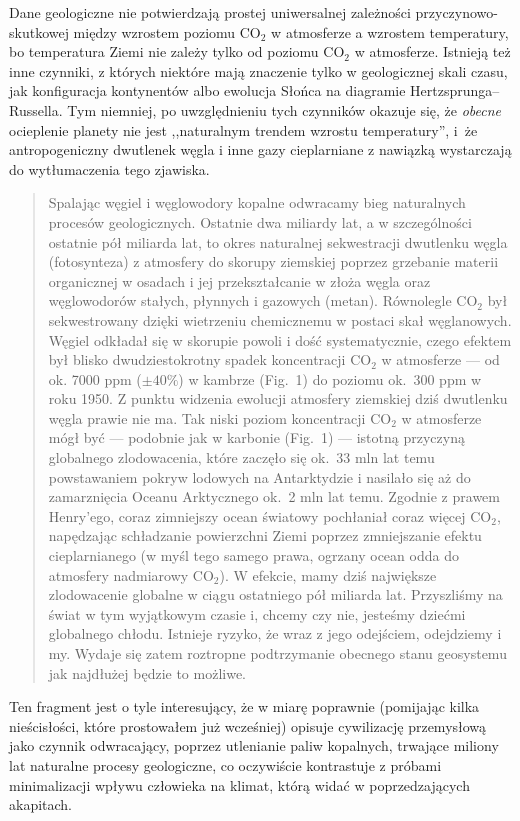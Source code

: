 \documentclass[12pt]{article}
\begin{document}
Dane geologiczne nie potwierdzają prostej uniwersalnej zależności przyczynowo-skutkowej między wzrostem poziomu CO$_2$ w atmosferze a wzrostem temperatury, bo temperatura Ziemi nie zależy tylko od poziomu CO$_2$ w atmosferze. Istnieją też inne czynniki, z których niektóre mają znaczenie tylko w geologicznej skali czasu, jak konfiguracja kontynentów albo ewolucja Słońca na diagramie Hertzsprunga--Russella. Tym niemniej, po uwzględnieniu tych czynników okazuje się, że \emph{obecne} ocieplenie planety nie jest ,,naturalnym trendem wzrostu temperatury'', i~że antropogeniczny dwutlenek węgla i inne gazy cieplarniane z nawiązką wystarczają do wytłumaczenia tego zjawiska.
			
\begin{quotation}
Spalając węgiel i węglowodory kopalne odwracamy bieg naturalnych procesów geologicznych. Ostatnie dwa miliardy lat, a w szczególności ostatnie pół miliarda lat, to okres naturalnej sekwestracji dwutlenku węgla (fotosynteza) z atmosfery do skorupy ziemskiej poprzez grzebanie materii organicznej w osadach i jej przekształcanie w złoża węgla oraz węglowodorów stałych, płynnych i gazowych (metan). Równolegle CO$_2$ był sekwestrowany dzięki wietrzeniu chemicznemu w postaci skał węglanowych. Węgiel odkładał się w skorupie powoli i dość systematycznie, czego efektem był blisko dwudziestokrotny spadek koncentracji CO$_2$ w atmosferze --- od ok. 7000 ppm ($\pm40\%$) w kambrze (Fig.~1) do poziomu ok.~300 ppm w roku 1950. Z punktu widzenia ewolucji atmosfery ziemskiej dziś dwutlenku węgla prawie nie ma. Tak niski poziom koncentracji CO$_2$ w atmosferze mógł być --- podobnie jak w karbonie (Fig.~1) --- istotną przyczyną globalnego zlodowacenia, które zaczęło się ok.~33 mln lat temu powstawaniem pokryw lodowych na Antarktydzie i nasilało się aż do zamarznięcia Oceanu Arktycznego ok.~2 mln lat temu. Zgodnie z prawem Henry'ego, coraz zimniejszy ocean światowy pochłaniał coraz więcej CO$_2$, napędzając schładzanie powierzchni Ziemi poprzez zmniejszanie efektu cieplarnianego (w myśl tego samego prawa, ogrzany ocean odda do atmosfery nadmiarowy CO$_2$). W efekcie, mamy dziś największe zlodowacenie globalne w ciągu ostatniego pół miliarda lat. Przyszliśmy na świat w tym wyjątkowym czasie i, chcemy czy nie, jesteśmy dziećmi globalnego chłodu. Istnieje ryzyko, że wraz z jego odejściem, odejdziemy i my. Wydaje się zatem roztropne podtrzymanie obecnego stanu geosystemu jak najdłużej będzie to możliwe.
\end{quotation}

Ten fragment jest o tyle interesujący, że w miarę poprawnie (pomijając kilka nieścisłości, które prostowałem już wcześniej) opisuje cywilizację przemysłową jako czynnik odwracający, poprzez utlenianie paliw kopalnych, trwające miliony lat naturalne procesy geologiczne, co oczywiście kontrastuje z próbami minimalizacji wpływu człowieka na klimat, którą widać w poprzedzających akapitach.
			
\end{document}
